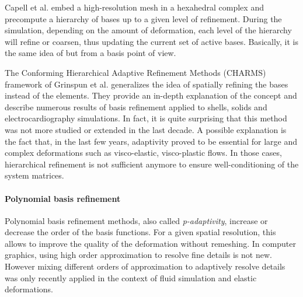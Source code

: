 Capell et al. \cite{Capell2002} embed a high-resolution mesh in a hexahedral complex and precompute a hierarchy of bases up to a given level of refinement. During the simulation, depending on the amount of deformation, each level of the hierarchy will refine or coarsen, thus updating the current set of active bases. Basically, it is the same idea of \cite{Debunne2001} but from a basis point of view.

The Conforming Hierarchical Adaptive Refinement Methods (CHARMS) framework of Grinspun et al. \cite{Grinspun2002} generalizes the idea of spatially refining the bases instead of the elements. They provide an in-depth explanation of the concept and describe numerous results of basis refinement applied to shells, solids and electrocardiography simulations.
In fact, it is quite surprising that this method was not more studied or extended in the last decade. A possible explanation is the fact that, in the last few years, adaptivity proved to be essential for large and complex deformations such as visco-elastic, visco-plastic flows. In those cases, hierarchical refinement is not sufficient anymore to ensure well-conditioning of the system matrices. 

\paragraph*{Polynomial basis refinement}
Polynomial basis refinement methods, also called \emph{p-adaptivity}, increase or decrease the order of the basis functions.
For a given spatial resolution, this allows to improve the quality of the deformation without remeshing. In computer graphics, using high order approximation to resolve fine details is not new. However mixing different orders of approximation to adaptively resolve details was only recently applied in the context of fluid simulation and elastic deformations.

